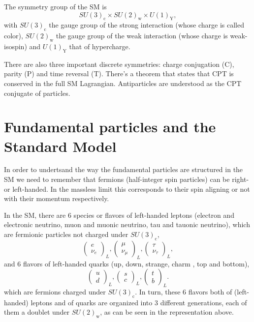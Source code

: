 The symmetry group of the SM is
\begin{equation}
SU(3)_{\textrm{c}}\times SU(2)_{\textrm{w}}\times U(1)_{\textrm{Y}},
\end{equation}
with $SU(3)_{\textrm{c}}$ the gauge group of the strong interaction (whose charge is called color), $SU(2)_{\textrm{w}}$ the gauge group of the weak interaction (whose charge is weak-isospin) and $U(1)_{\textrm{Y}}$ that of hypercharge. 

There are also three important discrete symmetries: charge conjugation (C), parity (P) and time reversal (T). There's a theorem that states that CPT is conserved in the full SM Lagrangian. Antiparticles are understood as the CPT conjugate of particles.

\section{Fundamental particles and the Standard Model}

In order to undertsand the way the fundamental particles are structured in the SM we need to remember that fermions (half-integer spin particles) can be right- or left-handed. In the massless limit this corresponds to their spin aligning or not with their momentum respectively. 

In the SM, there are 6 species or flavors of left-handed leptons (electron and electronic neutrino, muon and muonic neutrino, tau and tauonic neutrino), which are fermionic particles not charged under $SU(3)_{\textrm{c}}$,
\begin{equation}
\begin{pmatrix}
e\\ 
\nu_e
\end{pmatrix}_L,
\begin{pmatrix}
\mu\\ 
\nu_{\mu}
\end{pmatrix}_L,
\begin{pmatrix}
\tau\\ 
\nu_{\tau}
\end{pmatrix}_L,
\end{equation}
and 6 flavors of left-handed quarks (up, down, strange, charm , top and bottom), 
\begin{equation}
\begin{pmatrix}
u\\ 
d
\end{pmatrix}_L,
\begin{pmatrix}
s\\ 
c
\end{pmatrix}_L,
\begin{pmatrix}
t\\ 
b
\end{pmatrix}_L.
\end{equation}
which are fermions charged under $SU(3)_{\textrm{c}}$. In turn, these 6 flavors both of (left-handed) leptons and of quarks are organized into 3 different generations, each of them a doublet under $SU(2)_{\textrm{w}}$, as can be seen in the representation above.

